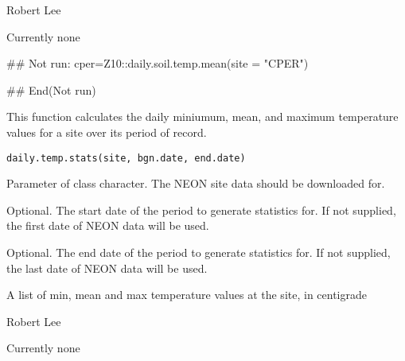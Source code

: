 \documentclass[a4paper]{book}
\begin{document}
%
\begin{Author}\relax
Robert Lee \\{}
\end{Author}
%
\begin{SeeAlso}\relax
Currently none
\end{SeeAlso}
%
\begin{Examples}
\begin{ExampleCode}
## Not run: 
cper=Z10::daily.soil.temp.mean(site = "CPER")

## End(Not run)
\end{ExampleCode}
\end{Examples}
%
\begin{Description}\relax
This function calculates the daily miniumum, mean, and maximum
temperature values for a site over its period of record.
\end{Description}
%
\begin{Usage}
\begin{verbatim}
daily.temp.stats(site, bgn.date, end.date)
\end{verbatim}
\end{Usage}
%
\begin{Arguments}
\begin{ldescription}
\item[\code{site}] Parameter of class character.
The NEON site data should be downloaded for.

\item[\code{bgn.date}] Optional. The start date of the period to generate statistics for.
If not supplied, the first date of NEON data will be used.

\item[\code{end.date}] Optional. The end date of the period to generate statistics for.
If not supplied, the last date of NEON data will be used.
\end{ldescription}
\end{Arguments}
%
\begin{Value}
A list of min, mean and max temperature
values at the site, in centigrade
\end{Value}
%
\begin{Author}\relax
Robert Lee \\{}
\end{Author}
%
\begin{SeeAlso}\relax
Currently none
\end{SeeAlso}
\end{document}
